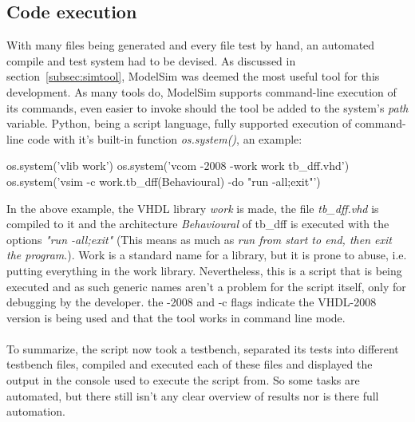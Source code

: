 \documentclass[11pt,british]{article}
\begin{document}
\subsection{Code execution}
With many files being generated and every file test by hand, an automated compile and test system had to be devised. As discussed in section~\ref{subsec:simtool}, ModelSim was deemed the most useful tool for this development. As many tools do, ModelSim supports command-line execution of its commands, even easier to invoke should the tool be added to the system's \emph{path} variable. Python, being a script language, fully supported execution of command-line code with it's built-in function \emph{os.system()}, an example:

\begin{python}
os.system('vlib work')
os.system('vcom -2008 -work work tb_dff.vhd')
os.system('vsim -c work.tb_dff(Behavioural) -do "run -all;exit"')
\end{python}

In the above example, the VHDL library \emph{work} is made, the file \emph{tb\_dff.vhd} is compiled to it and the architecture \emph{Behavioural} of tb\_dff is executed with the options \emph{"run -all;exit"} (This means as much as \emph{run from start to end, then exit the program}.). Work is a standard name for a library, but it is prone to abuse, i.e. putting everything in the work library. Nevertheless, this is a script that is being executed and as such generic names aren't a problem for the script itself, only for debugging by the developer. the -2008 and -c flags indicate the VHDL-2008 version is being used and that the tool works in command line mode.\\
\\
To summarize, the script now took a testbench, separated its tests into different testbench files, compiled and executed each of these files and displayed the output in the console used to execute the script from. So some tasks are automated, but there still isn't any clear overview of results nor is there full automation.
\end{document}
